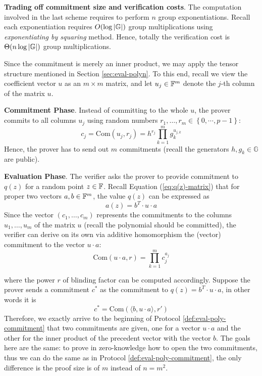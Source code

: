 \documentclass{article}
\begin{document}
\textbf{Trading off commitment size and verification costs}. The computation involved in the last scheme requires to perform $n$ group exponentiations. Recall each exponentiation requires $O(\log \abs{\mathbb{G}})$ group multiplications using \textit{exponentiating by squaring} method. Hence, totally the verification cost is $\Theta(n \log \abs{\mathbb{G}})$ group multiplications. 

Since the commitment is merely an inner product, we may apply the tensor structure mentioned in Section \ref{sec:eval-polyn}. To this end, recall we view the coefficient vector $u$ as an $m \times m$ matrix, and let $u_j \in \mathbb{F}^m$ denote the $j$-th column of the matrix $u$. 

\textbf{Commitment Phase}. Instead of committing to the whole $u$, the prover commits to all columns $u_j$ using random numbers $r_1, \dots, r_m \in \left\{ 0, \cdots, p-1 \right\}$:
\begin{equation*}
c_j = \text{Com}(u_j, r_j) = h^{r_j} \prod_{k = 1}^m g_k^{u_{j, k}}
\end{equation*}
Hence, the prover has to send out $m$ commitments (recall the generators $h, g_k \in \mathbb{G}$ are public).

\textbf{Evaluation Phase}. The verifier asks the prover to provide commitment to $q(z)$ for a random point $z \in \mathbb{F}$. Recall Equation (\ref{eq:q(z)-matrix}) that for proper two vectors $a, b \in \mathbb{F}^m$, the value $q(z)$ can be expressed as
\begin{equation*}
a(z) = b^T \cdot u \cdot a
\end{equation*}
Since the vector $(c_1, \dots, c_m)$ represents the commitments to the columns $u_1, \dots, u_m$ of the matrix $u$ (recall the polynomial should be committed), the verifier can derive on its own via additive homomorphism the (vector) commitment to the vector $u \cdot a$: 
\begin{equation*}
\text{Com}(u \cdot a, r) = \prod_{k = 1}^m c_j^{a_j}
\end{equation*}

where the power $r$ of blinding factor can be computed accordingly. Suppose the prover sends a commitment $c^{\displaystyle *}$ as the commitment to $q(z) = b^T \cdot u \cdot a$, in other words it is
\begin{equation*}
c^{\displaystyle *} = \text{Com}(\langle b, u \cdot a \rangle, r')
\end{equation*}
Therefore, we exactly arrive to the beginning of Protocol \ref{def:eval-poly-commitment} that two commitments are given, one for a vector $u \cdot a$ and the other for the inner product of the precedent vector with the vector $b$. The goals here are the same: to prove in zero-knowledge how to open the two commitments, thus we can do the same as in Protocol \ref{def:eval-poly-commitment}, the only difference is the proof size is of $m$ instead of $n = m^2$. 
\end{document}
